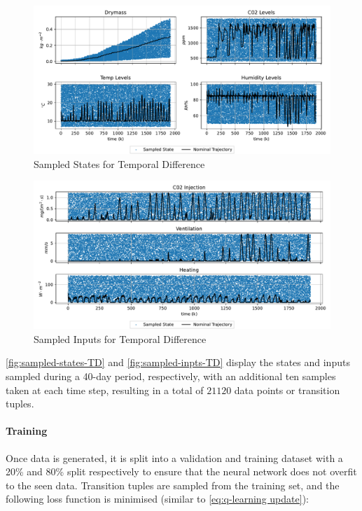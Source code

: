 \begin{figure}[H]
	\centering
	\includegraphics[width = \textwidth]{figures/sampled_y_td.png}
	\caption{Sampled States for Temporal Difference}
	\label{fig:sampled-states-TD}
\end{figure}
\begin{figure}[H]
	\centering
	\includegraphics[width = \textwidth]{figures/sampled_u_td.png}
	\caption{Sampled Inputs for Temporal Difference}
	\label{fig:sampled-inpts-TD}
\end{figure}

\autoref{fig:sampled-states-TD} and \autoref{fig:sampled-inpts-TD} display the states and inputs sampled during a 40-day period, respectively, with an additional ten samples taken at each time step, resulting in a total of $21120$ data points or transition tuples.



\paragraph{Training}
Once data is generated, it is split into a validation and training dataset with a 20\% and 80\% split respectively to ensure that the neural network does not overfit to the seen data. Transition tuples are sampled from the training set, and the following loss function is minimised (similar to \autoref{eq:q-learning update}):

